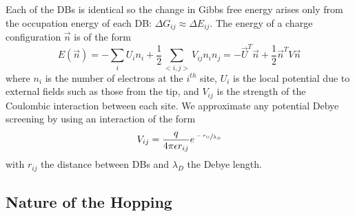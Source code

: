 \documentclass[11pt]{article}
\begin{document}
Each of the DBs is identical so the change in Gibbs free energy arises only from the occupation energy of each DB: $\Delta G_{ij} \approx \Delta E_{ij}$. The energy of a charge configuration $\vec{n}$ is of the form
\begin{equation}
E(\vec{n}) = -\sum_i U_i n_i + \frac{1}{2} \sum_{<i,j>} V_{ij}n_in_j = -\vec{U}^T\vec{n} + \frac{1}{2}\vec{n}^T V \vec{n}
\end{equation}
where $n_i$ is the number of electrons at the $i^{th}$ site, $U_i$ is the local potential due to external fields such as those from the tip, and $V_{ij}$ is the strength of the Coulombic interaction between each site. We approximate any potential Debye screening by using an interaction of the form
\begin{equation}
V_{ij} = \frac{q}{4\pi\epsilon r_{ij}}e^{\sfrac{-r_{ij}}{\lambda_D}}
\end{equation}
with $r_{ij}$ the distance between DBs and $\lambda_D$ the Debye length.


\subsection{Nature of the Hopping}
\end{document}
